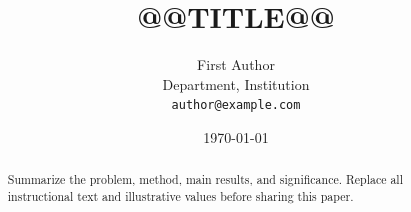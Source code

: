 \documentclass[11pt,letterpaper]{article}
\title{@@TITLE@@}
\author{First Author \\ Department, Institution \\ \texttt{author@example.com}}
\date{\today}
\begin{document}
\maketitle
\begin{abstract}
Summarize the problem, method, main results, and significance. Replace all
instructional text and illustrative values before sharing this paper.
\end{abstract}




\end{document}
